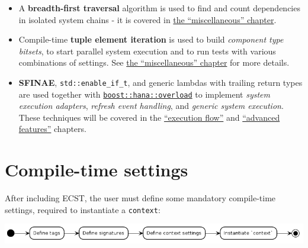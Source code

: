 \documentclass[twoside, 12pt, a4paper, openany]{book}
\let\origfigure=\figure
\let\endorigfigure=\endfigure
\renewenvironment{figure}[1][]{%
\origfigure[H]
}{%
\endorigfigure
}
\begin{document}
\begin{itemize}
\item
  A \textbf{breadth-first traversal} algorithm is used to find and count
  dependencies in isolated system chains - it is covered in
  \protect\hyperlink{appendix_compiletime_bfs}{the ``miscellaneous''
  chapter}.
\item
  Compile-time \textbf{tuple element iteration} is used to build
  \emph{component type bitsets}, to start parallel system execution and
  to run tests with various combinations of settings. See
  \protect\hyperlink{appendix_component_bitset_creation}{the
  ``miscellaneous'' chapter} for more details.
\item
  \textbf{SFINAE},
  \texttt{std::enable_if_t},
  and generic lambdas with trailing return types are used together with
  \href{http://www.boost.org/doc/libs/1_61_0/libs/hana/doc/html/overload_8hpp.html}{\texttt{boost::hana::overload}}
  to implement \emph{system execution adapters}, \emph{refresh event
  handling}, and \emph{generic system execution}. These techniques will
  be covered in the \protect\hyperlink{chap_flow}{``execution flow''}
  and \protect\hyperlink{chap_advfeats}{``advanced features''} chapters.
\end{itemize}

\hypertarget{chap_ecst_compiletime}{\chapter{Compile-time
settings}\label{chap_ecst_compiletime}}

After including ECST, the user must define some mandatory compile-time
settings, required to instantiate a
\texttt{context}:

\begin{figure}[htbp]
\centering
\includegraphics{source/figures/generated/ecst/compiletime/options_activity.png}
\caption{ECST compile-time settings: mandatory options}
\end{figure}
\end{document}

